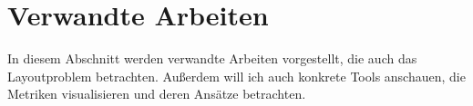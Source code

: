 \section{Verwandte Arbeiten} \label{sec:VerwandteArbeiten}
In diesem Abschnitt werden verwandte Arbeiten vorgestellt, die auch das Layoutproblem betrachten.
Außerdem will ich auch konkrete Tools anschauen, die Metriken visualisieren und deren Ansätze betrachten.

